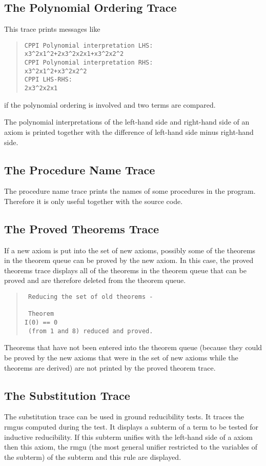 \subsection{The Polynomial Ordering Trace}
This trace prints messages like

\begin{quote}
\begin{verbatim}
CPPI Polynomial interpretation LHS:
x3^2x1^2+2x3^2x2x1+x3^2x2^2
CPPI Polynomial interpretation RHS:
x3^2x1^2+x3^2x2^2
CPPI LHS-RHS:
2x3^2x2x1
\end{verbatim}
\end{quote}

if the polynomial ordering is involved and two terms are
compared.

The polynomial interpretations of the left-hand side and right-hand side of an
axiom is printed together with the difference of left-hand side minus
right-hand side.

\subsection{The Procedure Name Trace}
The procedure name trace prints the names of some procedures in the
program. Therefore it is only useful together with the source code.

\subsection{The Proved Theorems Trace}
If a new axiom is put into the set of new axioms, possibly some of the
theorems in the theorem queue can be proved by the new axiom. In this
case, the proved theorems trace displays all of the theorems in the
theorem queue that can be proved and are therefore deleted from the
theorem queue. 
\begin{quote}
\begin{verbatim}
 Reducing the set of old theorems -

 Theorem
I(0) == 0
 (from 1 and 8) reduced and proved.
\end{verbatim}
\end{quote}
Theorems that have not been entered into the theorem queue (because they 
could be proved by the new axioms that were in the set of new axioms
while the theorems are derived) are not printed by the proved theorem
trace.

\subsection{The Substitution Trace}
The substitution trace can be used in ground reducibility tests.
It traces the rmgus computed during the test.
It displays a subterm of a term to be tested for inductive
reducibility. If this subterm unifies with the left-hand side of a axiom
then this axiom, the rmgu (the most general unifier restricted to the
variables of the subterm) of the 
subterm and this rule are displayed.

